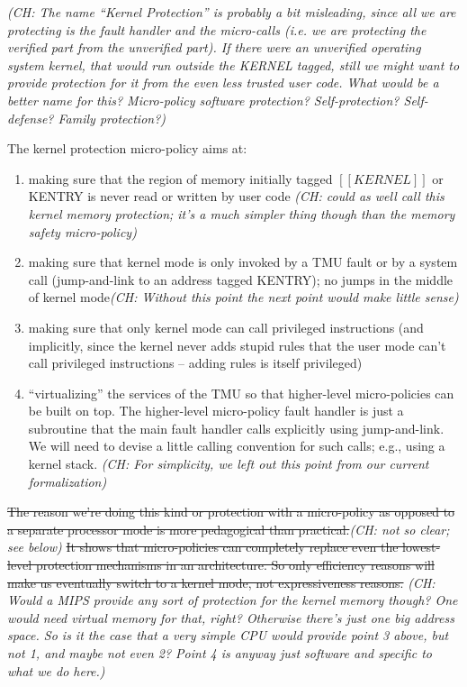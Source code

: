 \documentclass{article}
\newcommand{\ch}[1]{{\color{dkblue}\em (CH: #1)}}
\newcommand*{\EG}{e.g.,\xspace}
\begin{document}
\ch{The name ``Kernel Protection'' is probably a bit misleading, since
  all we are protecting is the fault handler and the micro-calls
  (i.e. we are protecting the verified part from the
  unverified part). If there were an unverified {\em operating system
    kernel}, that would run outside the KERNEL tagged, still we might
  want to provide protection for it from the even less trusted user
  code. What would be a better name for this? Micro-policy software
  protection? Self-protection? {\em Self-defense?} Family protection?}

The kernel protection micro-policy aims at:
\begin{enumerate}
\item making sure that the region of memory initially tagged
  $[[KERNEL]]$ or KENTRY is never read or written by user code
  \ch{could as well call this kernel memory protection; it's a much
    simpler thing though than the memory safety micro-policy}
\item making sure that kernel mode is only invoked by a TMU fault or
  by a system call (jump-and-link to an address tagged KENTRY);
  no jumps in the middle of kernel mode\ch{Without this point
  the next point would make little sense}
\item making sure that only kernel mode can call privileged
  instructions (and implicitly, since the kernel never adds stupid
  rules that the user mode can't call privileged instructions --
  adding rules is itself privileged)
\item ``virtualizing'' the services of the TMU so that higher-level
  micro-policies can be built on top. The higher-level micro-policy
  fault handler is just a subroutine that the main fault handler calls
  explicitly using jump-and-link. We will need to devise a little
  calling convention for such calls; \EG using a kernel stack.
  \ch{For simplicity, we left out this point from our current
    formalization}
\end{enumerate}

\sout{The reason we're doing this kind or protection with a micro-policy as
opposed to a separate processor mode is more pedagogical than
practical.}\ch{not so clear; see below} \sout{It shows that micro-policies
can completely replace even the lowest-level protection mechanisms in
an architecture. So only efficiency reasons will make us eventually
switch to a kernel mode, not expressiveness reasons.} \ch{Would a MIPS
  provide any sort of protection for the kernel memory though? One
  would need virtual memory for that, right? Otherwise there's just
  one big address space. So is it the case that a very simple CPU
  would provide point 3 above, but not 1, and maybe not even 2? Point
  4 is anyway just software and specific to what we do here.}
\end{document}

